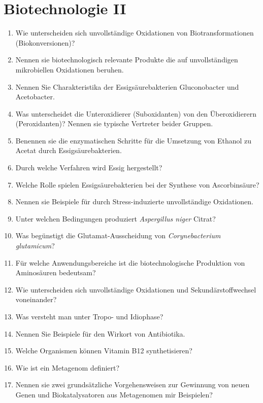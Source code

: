 
\section{Biotechnologie II}
\begin{enumerate}
	\item Wie unterscheiden sich unvollständige Oxidationen von Biotransformationen (Biokonversionen)?
	\item Nennen sie biotechnologisch relevante Produkte die auf unvollständigen mikrobiellen Oxidationen beruhen.
	\item Nennen Sie Charakteristika der Essigsäurebakterien Gluconobacter und Acetobacter.
	\item Was unterscheidet die Unteroxidierer (Suboxidanten) von den Überoxidierern (Peroxidanten)? Nennen sie typische Vertreter beider Gruppen.
	\item Benennen sie die enzymatischen Schritte für die Umsetzung von Ethanol zu Acetat durch Essigsäurebakterien.
	\item Durch welche Verfahren wird Essig hergestellt?
	\item Welche Rolle spielen Essigsäurebakterien bei der Synthese von Ascorbinsäure?
	\item Nennen sie Beispiele für durch Stress-induzierte unvollständige Oxidationen.
	\item Unter welchen Bedingungen produziert \emph{Aspergillus niger} Citrat?
	\item Was begünstigt die Glutamat-Ausscheidung von \emph{Corynebacterium glutamicum}?
	\item Für welche Anwendungsbereiche ist die biotechnologische Produktion von Aminosäuren bedeutsam?
	\item Wie unterscheiden sich unvollständige Oxidationen und Sekundärstoffwechsel voneinander?
	\item Was versteht man unter Tropo- und Idiophase?
	\item Nennen Sie Beispiele für den Wirkort von Antibiotika.
	\item Welche Organismen können Vitamin B12 synthetisieren?
	\item Wie ist ein Metagenom definiert?
	\item Nennen sie zwei grundsätzliche Vorgehensweisen zur Gewinnung von neuen Genen und Biokatalysatoren aus Metagenomen mir Beispielen?
\end{enumerate}
